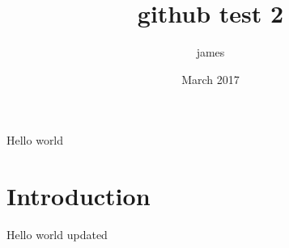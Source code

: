 \documentclass{article}
\title{github test 2}
\author{james }
\date{March 2017}
\begin{document}
\maketitle

Hello world

\section{Introduction}

Hello world updated
\end{document}
